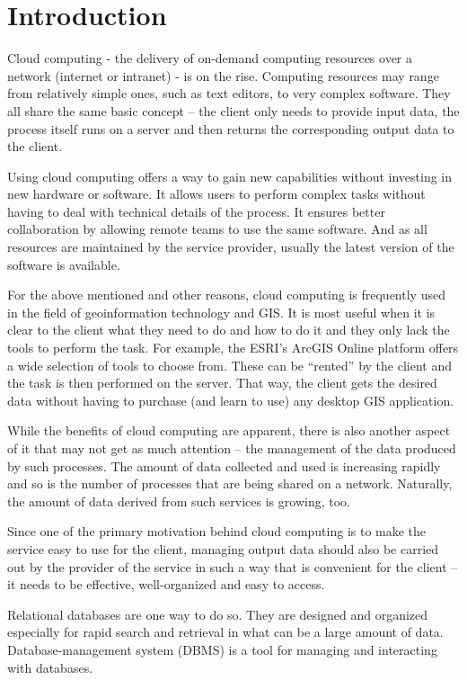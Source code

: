 \chapter{Introduction}
\label{1-introduction}

	Cloud computing - the delivery of on-demand computing resources over a network (internet or intranet) -  is on the rise. Computing resources may range from relatively simple ones, such as text editors, to very complex software. They all share the same basic concept – the client only needs to provide input data, the process itself runs on a server and then returns the corresponding output data to the client.

Using cloud computing offers a way to gain new capabilities without investing in new hardware or software. It allows users to perform complex tasks without having to deal with technical details of the process. It ensures better collaboration by allowing remote teams to use the same software. And as all resources are maintained by the service provider, usually the latest version of the software is available.

For the above mentioned and other reasons, cloud computing is frequently used in the field of geoinformation technology and GIS. It is most useful when it is clear to the client what they need to do and how to do it and they only lack the tools to perform the task. For example, the ESRI’s ArcGIS Online platform offers a wide selection of tools to choose from. These can be “rented” by the client and the task is then performed on the server. That way, the client gets the desired data without having to purchase (and learn to use) any desktop GIS application.

While the benefits of cloud computing are apparent, there is also another aspect of it that may not get as much attention – the management of the data produced by such processes. The amount of data collected and used is increasing rapidly and so is the number of processes that are being shared on a network. Naturally, the amount of data derived from such services is growing, too. 

Since one of the primary motivation behind cloud computing is to make the service easy to use for the client, managing output data should also be carried out by the provider of the service in such a way that is convenient for the client – it needs to be effective, well-organized and easy to access.

	Relational databases are one way to do so. They are designed and organized especially for rapid search and retrieval in what can be a large amount of data. Database-management system (DBMS) is a tool for managing and interacting with databases. 
	

